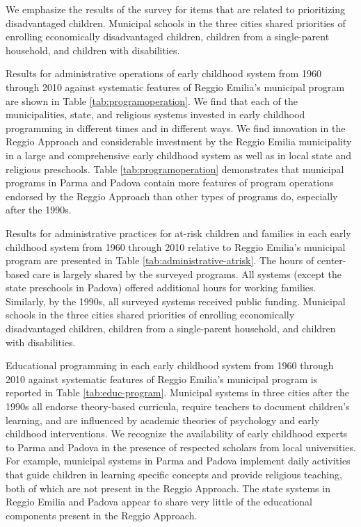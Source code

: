 We emphasize the results of the survey for items that are related to prioritizing disadvantaged children. Municipal schools in the three cities shared priorities of enrolling economically disadvantaged children, children from a single-parent household, and children with disabilities.


Results for administrative operations of early childhood system from 1960 through 2010 against systematic features of Reggio Emilia's municipal program are shown in Table \ref{tab:programoperation}. We find that each of the municipalities, state, and religious systems invested in early childhood programming in different times and in different ways. We find innovation in the Reggio Approach and considerable investment by the Reggio Emilia municipality in a large and comprehensive early childhood system as well as in local state and religious preschools. Table \ref{tab:programoperation} demonstrates that municipal programs in Parma and Padova contain more features of program operations endorsed by the Reggio Approach than other types of programs do, especially after the 1990s.

Results for administrative practices for at-risk children and families in each early childhood system from 1960 through 2010 relative to Reggio Emilia's municipal program are presented in Table \ref{tab:administrative-atrisk}. The hours of center-based care is largely shared by the surveyed programs. All systems (except the state preschools in Padova) offered additional hours for working families. Similarly, by the 1990s, all surveyed systems received public funding. Municipal schools in the three cities shared priorities of enrolling economically disadvantaged children, children from a single-parent household, and children with disabilities.							

Educational programming in each early childhood system from 1960 through 2010 against systematic features of Reggio Emilia's municipal program is reported in Table \ref{tab:educ-program}. Municipal systems in three cities after the 1990s all endorse theory-based curricula, require teachers to document children's learning, and are influenced by academic theories of psychology and early childhood interventions. We recognize the availability of early childhood experts to Parma and Padova in the presence of respected scholars from local universities. For example, municipal systems in Parma and Padova implement daily activities that guide children in learning specific concepts and provide religious teaching, both of which are not present in the Reggio Approach. The state systems in Reggio Emilia and Padova appear to share very little of the educational components present in the Reggio Approach.												

